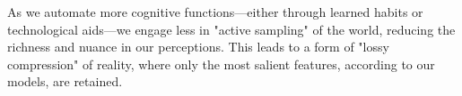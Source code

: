 As we automate more cognitive functions—either through learned habits or technological aids—we engage less in "active sampling" of the world, reducing the richness and nuance in our perceptions. This leads to a form of "lossy compression" of reality, where only the most salient features, according to our models, are retained.













